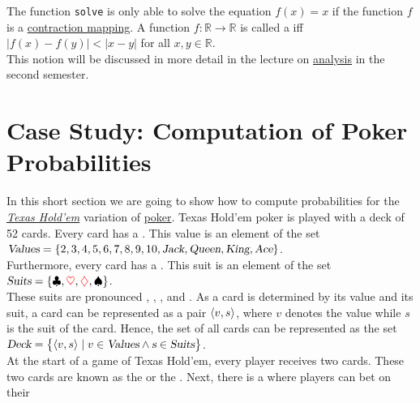 \remarkEng
The function \texttt{solve} is only able to solve the equation $f(x) = x$ if the function $f$ is a 
\href{https://en.wikipedia.org/wiki/Contraction_mapping}{contraction mapping}.  A function 
$f:\mathbb{R} \rightarrow \mathbb{R}$
is called a  iff 
\\[0.2cm]
\hspace*{1.3cm}
$|f(x) - f(y)| < |x - y|$ \quad for all $x,y \in \mathbb{R}$.
\\[0.2cm]
This notion will be discussed in more detail in the lecture on 
\href{https://github.com/karlstroetmann/Analysis/blob/master/Script/analysis.pdf}{analysis} in the second
semester. \eox  

\section{Case Study: Computation of Poker Probabilities}
In this short section we are going to show how to compute probabilities for the
\href{https://en.wikipedia.org/wiki/Texas_hold_%27em}{\textsl{Texas Hold'em}} variation of 
\href{https://en.wikipedia.org/wiki/Poker}{poker}.   Texas Hold'em poker is played with a deck of 52
cards.  Every card has a .  This value is an element of the set
\\[0.2cm]
\hspace*{1.3cm} 
$\textsl{Values} = \{ 2, 3, 4, 5, 6, 7, 8, 9, 10, \textsl{Jack}, \textsl{Queen}, \textsl{King}, \textsl{Ace} \}$.
\\[0.2cm]
Furthermore, every card has a .  This suit is an element of the set
\\[0.2cm]
\hspace*{1.3cm} 
$\textsl{Suits} = \{ \clubsuit , \mbox{$\color{red}{\ensuremath{\heartsuit }}$}, \mbox{$\color{red}{\diamondsuit}$}, \spadesuit  \}$.
\\[0.2cm]
These suits are pronounced , , , and .
As a card is determined by its value and its suit, a card can be represented as a pair $\pair(v,s)$, where $v$
denotes the value while $s$ is the suit of the card.  Hence, the set of all cards can be represented as the set
\\[0.2cm]
\hspace*{1.3cm} 
$\textsl{Deck} = \bigl\{ \pair(v,s) \mid v \in \textsl{Values} \wedge \textsl{s} \in \textsl{Suits} \bigr\}$.
\\[0.2cm]
At the start of a game of Texas Hold'em, every player receives two cards.  These two cards are known
as the  or the .  Next, there is a  where players can bet on their
